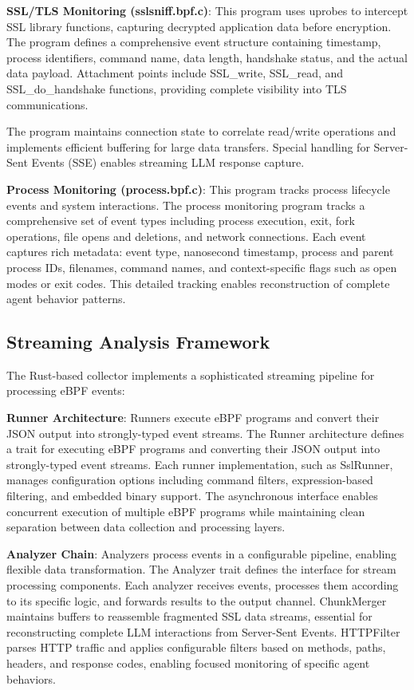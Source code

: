 \documentclass[sigplan,screen，review,9pt]{acmart}
\begin{document}
\textbf{SSL/TLS Monitoring (sslsniff.bpf.c)}: This program uses uprobes to intercept SSL library functions, capturing decrypted application data before encryption. The program defines a comprehensive event structure containing timestamp, process identifiers, command name, data length, handshake status, and the actual data payload. Attachment points include SSL\_write, SSL\_read, and SSL\_do\_handshake functions, providing complete visibility into TLS communications.

The program maintains connection state to correlate read/write operations and implements efficient buffering for large data transfers. Special handling for Server-Sent Events (SSE) enables streaming LLM response capture.

\textbf{Process Monitoring (process.bpf.c)}: This program tracks process lifecycle events and system interactions. The process monitoring program tracks a comprehensive set of event types including process execution, exit, fork operations, file opens and deletions, and network connections. Each event captures rich metadata: event type, nanosecond timestamp, process and parent process IDs, filenames, command names, and context-specific flags such as open modes or exit codes. This detailed tracking enables reconstruction of complete agent behavior patterns.

\subsection{Streaming Analysis Framework}

The Rust-based collector implements a sophisticated streaming pipeline for processing eBPF events:

\textbf{Runner Architecture}: Runners execute eBPF programs and convert their JSON output into strongly-typed event streams. The Runner architecture defines a trait for executing eBPF programs and converting their JSON output into strongly-typed event streams. Each runner implementation, such as SslRunner, manages configuration options including command filters, expression-based filtering, and embedded binary support. The asynchronous interface enables concurrent execution of multiple eBPF programs while maintaining clean separation between data collection and processing layers.

\textbf{Analyzer Chain}: Analyzers process events in a configurable pipeline, enabling flexible data transformation. The Analyzer trait defines the interface for stream processing components. Each analyzer receives events, processes them according to its specific logic, and forwards results to the output channel. ChunkMerger maintains buffers to reassemble fragmented SSL data streams, essential for reconstructing complete LLM interactions from Server-Sent Events. HTTPFilter parses HTTP traffic and applies configurable filters based on methods, paths, headers, and response codes, enabling focused monitoring of specific agent behaviors.
\end{document}
